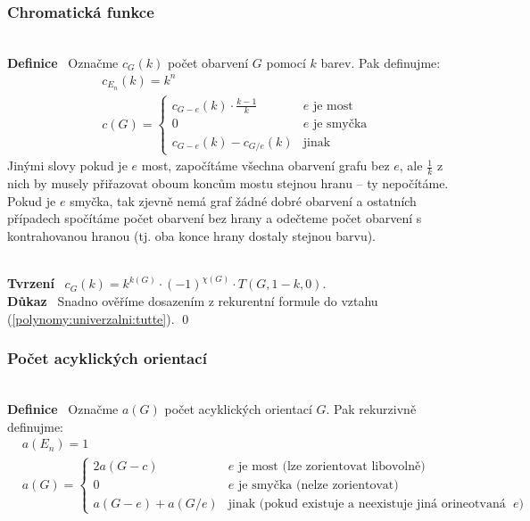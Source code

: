 \documentclass{article}
\renewcommand{\paragraph}[1]{\ \\\smallskip\noindent\textbf{#1}\ }
\begin{document}
\subsubsection{Chromatická funkce}
\paragraph{Definice} Označme $c_G(k)$ počet obarvení $G$ pomocí $k$ barev. Pak 
definujme:
\begin{align}
	&c_{E_n}(k) = k^n \\
	&c(G) = \left\{ \begin{array}{ll}
	c_{G-e}(k) \cdot\frac{k-1}{k}& e \text{ je most} \\
	0 & e \text{ je smyčka}\\
	c_{G-e}(k) - c_{G/e}(k) & \text{jinak}
	\end{array}
	\right.
\end{align}
Jinými slovy pokud je $e$ most, započítáme všechna obarvení grafu bez $e$, ale 
$\frac{1}{k}$ z nich by musely přiřazovat oboum koncům mostu stejnou hranu -- ty 
nepočítáme.  Pokud je $e$ smyčka, tak zjevně nemá graf žádné dobré obarvení a 
ostatních případech spočítáme počet obarvení bez hrany a odečteme počet obarvení 
s kontrahovanou hranou (tj. oba konce hrany dostaly stejnou barvu).

\paragraph{Tvrzení} $c_G(k) = k^{k(G)} \cdot (-1)^{\chi(G)} \cdot T(G, 1-k, 0)$.
\paragraph{Důkaz} Snadno ověříme dosazením z rekurentní formule do vztahu 
(\ref{polynomy:univerzalni:tutte}). \qed

\subsubsection{Počet acyklických orientací}
\paragraph{Definice} Označme $a(G)$ počet acyklických orientací $G$. Pak 
rekurzivně definujme:
\begin{align}
	&a(E_n) = 1 \\
	&a(G) = \left\{ \begin{array}{ll}
	2a(G-c) & e \text{ je most (lze zorientovat libovolně)} \\
	0 & e \text{ je smyčka (nelze zorientovat)}\\
	a(G-e) + a(G/e) & \text{jinak (pokud existuje a neexistuje jiná orineotvaná 
	cesta směrem $e$)}
	\end{array}
	\right.
\end{align}
\end{document}

